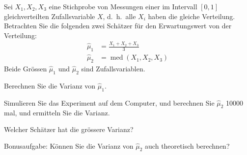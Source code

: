 Sei $X_1,X_2,X_3$ eine Stichprobe von Messungen einer im
Intervall $[0,1]$ gleichverteilten Zufallsvariable $X$,
d.~h.~alle $X_i$ haben die gleiche Verteilung. Betrachten Sie die folgenden
zwei Schätzer für den Erwartungswert von der Verteilung:
\begin{align*}
\hat\mu_1&=\frac{X_1+X_2+X_3}3\\
\hat\mu_2&=\operatorname{med}(X_1,X_2,X_3)
\end{align*}
Beide Grössen $\hat\mu_1$ und $\hat\mu_2$ sind Zufallsvariablen.
\begin{teilaufgaben}
\item
Berechnen Sie die Varianz von $\hat\mu_1$.
\item
Simulieren Sie das Experiment auf dem Computer, und berechnen Sie
$\hat\mu_2$ 10000 mal, und ermitteln Sie die Varianz.
\item
Welcher Schätzer hat die grössere Varianz?
\item
Bonusaufgabe:
Können Sie die Varianz von $\hat\mu_2$ auch theoretisch
berechnen?
\end{teilaufgaben}

